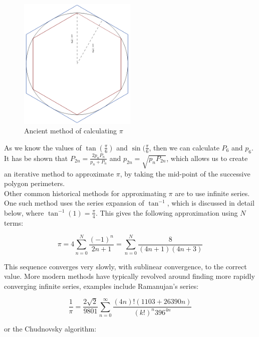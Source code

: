 \begin{figure}[!ht]
	\label{FIG_"Pi Diagram 1"}
	\caption{Ancient method of calculating \(\pi\)}
	\centering
	\includegraphics[width=0.5\textwidth]{"./Diagrams/Pi Diagram 1"}
\end{figure}

As we know the values of \(\tan(\frac{\pi}{6})\) and \(\sin(\frac{\pi}{6}\), then we can calculate \(P_6\) and \(p_6\). It has be shown that \(P_{2n} = \frac{2p_nP_n}{p_n + P_n}\) and \(p_{2n} = \sqrt{p_nP_{2n}}\), which allows us to create an iterative method to approximate \(\pi\), by taking the mid-point of the successive polygon perimeters.\\

Other common historical methods for approximating \(\pi\) are to use infinite series. One such method uses the series expansion of \(\tan^{-1}\), which is discussed in detail below, where \(\tan^{-1}(1) = \frac{\pi}{4}\). This gives the following approximation using \(N\) terms:

\begin{equation}
\label{EQN_"Tan pi Series"}
\pi = 4\sum_{n=0}^{N} \frac{(-1)^n}{2n+1} = \sum_{n=0}^N \frac{8}{(4n+1)(4n+3)}
\end{equation}

This sequence converges very slowly, with sublinear convergence, to the correct value. More modern methods have typically revolved around finding more rapidly converging infinite series, examples include Ramanujan's series:

\begin{equation}
\frac{1}{\pi} = \frac{2\sqrt{2}}{9801}\sum_{n=0}^\infty \frac{(4n)!(1103 + 26390n)}{(k!)^n396^{4n}}
\end{equation}

or the Chudnovsky algorithm:

